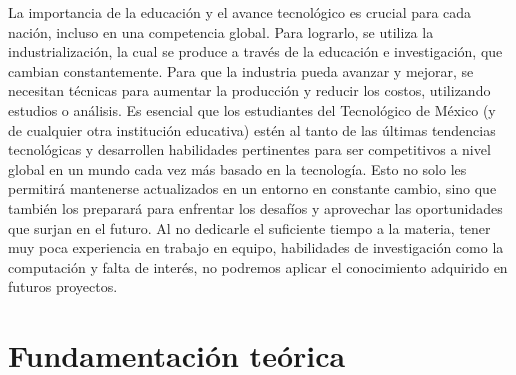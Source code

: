 % 
% 
La importancia de la educación y el avance tecnológico es crucial para cada nación, incluso en una competencia global. Para lograrlo, se utiliza la industrialización, la cual se produce a través de la educación e investigación, que cambian constantemente. Para que la industria pueda avanzar y mejorar, se necesitan técnicas para aumentar la producción y reducir los costos, utilizando estudios o análisis. 
Es esencial que los estudiantes del Tecnológico de México (y de cualquier otra institución educativa) estén al tanto de las últimas tendencias tecnológicas y desarrollen habilidades pertinentes para ser competitivos a nivel global en un mundo cada vez más basado en la tecnología. Esto no solo les permitirá mantenerse actualizados en un entorno en constante cambio, sino que también los preparará para enfrentar los desafíos y aprovechar las oportunidades que surjan en el futuro. 
% 
Al no dedicarle el suficiente tiempo a la materia, tener muy poca experiencia en trabajo en equipo, habilidades de investigación como la computación y falta de interés, no podremos aplicar el conocimiento adquirido en futuros proyectos. 

% 
% 
\section{Fundamentación teórica}

